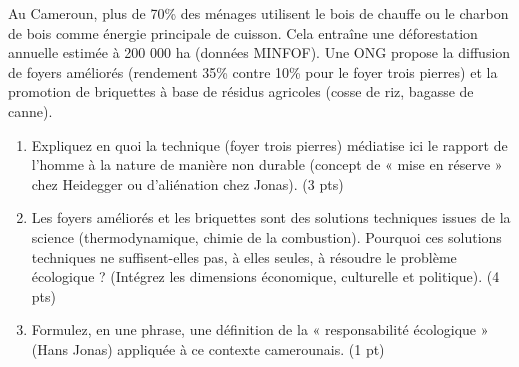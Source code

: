 \documentclass[11pt]{article}
\begin{document}
\begin{exercice}
Au Cameroun, plus de 70\% des ménages utilisent le bois de chauffe ou le charbon de bois comme énergie principale de cuisson. Cela entraîne une déforestation annuelle estimée à 200 000 ha (données MINFOF). Une ONG propose la diffusion de foyers améliorés (rendement 35\% contre 10\% pour le foyer trois pierres) et la promotion de briquettes à base de résidus agricoles (cosse de riz, bagasse de canne).
\begin{enumerate}
    \item Expliquez en quoi la technique (foyer trois pierres) médiatise ici le rapport de l'homme à la nature de manière non durable (concept de « mise en réserve » chez Heidegger ou d'aliénation chez Jonas). (3 pts)
    \item Les foyers améliorés et les briquettes sont des solutions techniques issues de la science (thermodynamique, chimie de la combustion). Pourquoi ces solutions techniques ne suffisent-elles pas, à elles seules, à résoudre le problème écologique ? (Intégrez les dimensions économique, culturelle et politique). (4 pts)
    \item Formulez, en une phrase, une définition de la « responsabilité écologique » (Hans Jonas) appliquée à ce contexte camerounais. (1 pt)
\end{enumerate}
\end{exercice}
\end{document}
